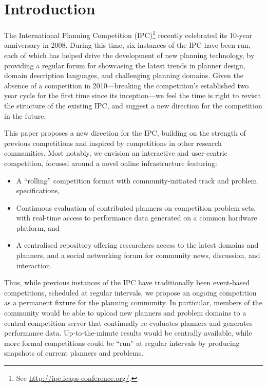 \section{Introduction}
\label{sec:introduction}


The International Planning Competition (IPC)\footnote{See
\url{http://ipc.icaps-conference.org/}.} recently celebrated its 10-year
anniversary in 2008. During this time, six instances of the IPC have been
run, each of which has helped drive the development of new planning
technology, by providing a regular forum for showcasing the latest trends
in planner design, domain description languages, and challenging planning
domains. Given the absence of a competition in 2010---breaking the
competition's established two year cycle for the first time since its
inception---we feel the time is right to revisit the structure of the
existing IPC, and suggest a new direction for the competition in the
future.

This paper proposes a new direction for the IPC, building on the strength
of previous competitions and inspired by competitions in other research
communities. Most notably, we envision an interactive and user-centric
competition, focused around a novel online infrastructure featuring:
%
\begin{itemize}
\item A ``rolling'' competition format with community-initiated track and
problem specifications,

\item Continuous evaluation of contributed planners on competition
problem sets, with real-time access to performance data generated on a
common hardware platform, and

\item A centralised repository offering researchers access to the latest
domains and planners, and a social networking forum for community news,
discussion, and interaction.
\end{itemize}

Thus, while previous instances of the IPC have traditionally been
event-based competitions, scheduled at regular intervals, we propose an
ongoing competition as a permanent fixture for the planning community. In
particular, members of the community would be able to upload new planners
and problem domains to a central competition server that continually
re-evaluates planners and generates performance data. Up-to-the-minute
results would be centrally available, while more formal competitions could
be ``run'' at regular intervals by producing snapshots of current planners
and problems. 

